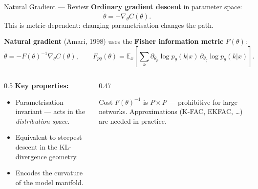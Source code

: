 \documentclass[aspectratio=169, 10pt]{beamer}
\newcommand{\E}{\mathbb{E}}
\begin{document}
\begin{frame}{Natural Gradient — Review}
  \textbf{Ordinary gradient descent} in parameter space:
  \[
    \dot\theta = -\nabla_\theta C(\theta).
  \]
  This is metric-dependent: changing parametrisation changes the path.

  \vspace{0.4em}
  \textbf{Natural gradient} (Amari, 1998) uses the \textbf{Fisher information metric} $F(\theta)$:
  \[
    \boxed{\dot\theta = -F(\theta)^{-1}\nabla_\theta C(\theta)},
    \qquad
    F_{pq}(\theta) = \E_x\!\left[\sum_k \partial_{\theta_p}\log p_\theta(k|x)\,\partial_{\theta_q}\log p_\theta(k|x)\right].
  \]

  \begin{columns}[T]
    \begin{column}{0.5\textwidth}
      \textbf{Key properties:}
      \begin{itemize}
        \item Parametrisation-invariant — acts in the \emph{distribution space}.
        \item Equivalent to steepest descent in the KL-divergence geometry.
        \item Encodes the curvature of the model manifold.
      \end{itemize}
    \end{column}
    \begin{column}{0.47\textwidth}
      \begin{alertblock}{Cost}
        $F(\theta)^{-1}$ is $P\times P$ — prohibitive for large networks. Approximations (K-FAC, EKFAC, \ldots) are needed in practice.
      \end{alertblock}
    \end{column}
  \end{columns}
\end{frame}
\end{document}

